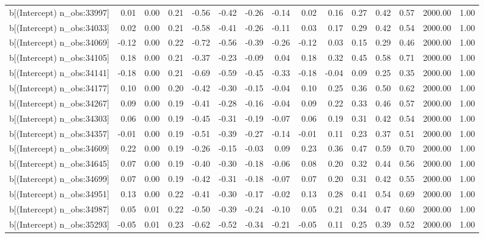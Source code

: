 \begin{table}[ht]
\begin{tabular}{rrrrrrrrrrrrrrr}
  b[(Intercept) n\_obs:33997] & 0.01 & 0.00 & 0.21 & -0.56 & -0.42 & -0.26 & -0.14 & 0.02 & 0.16 & 0.27 & 0.42 & 0.57 & 2000.00 & 1.00 \\ 
  b[(Intercept) n\_obs:34033] & 0.02 & 0.00 & 0.21 & -0.58 & -0.41 & -0.26 & -0.11 & 0.03 & 0.17 & 0.29 & 0.42 & 0.54 & 2000.00 & 1.00 \\ 
  b[(Intercept) n\_obs:34069] & -0.12 & 0.00 & 0.22 & -0.72 & -0.56 & -0.39 & -0.26 & -0.12 & 0.03 & 0.15 & 0.29 & 0.46 & 2000.00 & 1.00 \\ 
  b[(Intercept) n\_obs:34105] & 0.18 & 0.00 & 0.21 & -0.37 & -0.23 & -0.09 & 0.04 & 0.18 & 0.32 & 0.45 & 0.58 & 0.71 & 2000.00 & 1.00 \\ 
  b[(Intercept) n\_obs:34141] & -0.18 & 0.00 & 0.21 & -0.69 & -0.59 & -0.45 & -0.33 & -0.18 & -0.04 & 0.09 & 0.25 & 0.35 & 2000.00 & 1.00 \\ 
  b[(Intercept) n\_obs:34177] & 0.10 & 0.00 & 0.20 & -0.42 & -0.30 & -0.15 & -0.04 & 0.10 & 0.25 & 0.36 & 0.50 & 0.62 & 2000.00 & 1.00 \\ 
  b[(Intercept) n\_obs:34267] & 0.09 & 0.00 & 0.19 & -0.41 & -0.28 & -0.16 & -0.04 & 0.09 & 0.22 & 0.33 & 0.46 & 0.57 & 2000.00 & 1.00 \\ 
  b[(Intercept) n\_obs:34303] & 0.06 & 0.00 & 0.19 & -0.45 & -0.31 & -0.19 & -0.07 & 0.06 & 0.19 & 0.31 & 0.42 & 0.54 & 2000.00 & 1.00 \\ 
  b[(Intercept) n\_obs:34357] & -0.01 & 0.00 & 0.19 & -0.51 & -0.39 & -0.27 & -0.14 & -0.01 & 0.11 & 0.23 & 0.37 & 0.51 & 2000.00 & 1.00 \\ 
  b[(Intercept) n\_obs:34609] & 0.22 & 0.00 & 0.19 & -0.26 & -0.15 & -0.03 & 0.09 & 0.23 & 0.36 & 0.47 & 0.59 & 0.70 & 2000.00 & 1.00 \\ 
  b[(Intercept) n\_obs:34645] & 0.07 & 0.00 & 0.19 & -0.40 & -0.30 & -0.18 & -0.06 & 0.08 & 0.20 & 0.32 & 0.44 & 0.56 & 2000.00 & 1.00 \\ 
  b[(Intercept) n\_obs:34699] & 0.07 & 0.00 & 0.19 & -0.42 & -0.31 & -0.18 & -0.07 & 0.07 & 0.20 & 0.31 & 0.42 & 0.55 & 2000.00 & 1.00 \\ 
  b[(Intercept) n\_obs:34951] & 0.13 & 0.00 & 0.22 & -0.41 & -0.30 & -0.17 & -0.02 & 0.13 & 0.28 & 0.41 & 0.54 & 0.69 & 2000.00 & 1.00 \\ 
  b[(Intercept) n\_obs:34987] & 0.05 & 0.01 & 0.22 & -0.50 & -0.39 & -0.24 & -0.10 & 0.05 & 0.21 & 0.34 & 0.47 & 0.60 & 2000.00 & 1.00 \\ 
  b[(Intercept) n\_obs:35293] & -0.05 & 0.01 & 0.23 & -0.62 & -0.52 & -0.34 & -0.21 & -0.05 & 0.11 & 0.25 & 0.39 & 0.52 & 2000.00 & 1.00 \\ 

\end{tabular}
\end{table}
